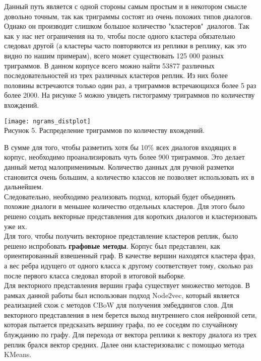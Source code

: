 \documentclass[a4paper,14pt]{article}
\begin{document}
\begin{justify}
\indent
Данный путь является с одной стороны самым простым и в некотором смысле довольно точным, так как триграммы состоят из очень похожих типов диалогов. Однако он производит слишком большое количество "кластеров"\ диалогов. Так как у нас нет ограничения на то, чтобы после одного кластера обязательно следовал другой (а кластеры часто повторяются из реплики в реплику, как это видно по нашим примерам), всего может существовать 125 000 разных триграммов. В данном корпусе всего можно найти 53877 различных последовательностей из трех различных кластеров реплик. Из них более половины встречаются только один раз, а триграммов встречающихся более 5 раз более 2000. На рисунке 5 можно увидеть гистограмму триграммов по количеству вхождений.
\begin{center}
	\texttt{[image: ngrams\_distplot]} \\
	Рисунок 5. Распределение триграммов по количеству вхождений.
\end{center}
В сумме для того, чтобы разметить хотя бы 10\% всех диалогов входящих в корпус, необходимо проанализировать чуть более 900 триграммов. Это делает данный метод малоприменимым. Количество данных для ручной разметки становится очень большим, а количество классов не позволяет использовать их в дальнейшем. \\
\indent
Следовательно, необходимо реализовать подход, который будет объединять похожие диалоги в меньшее количество отдельных кластеров. Для этого было решено создать векторные представления для коротких диалогов и кластеризовать уже их. \\
\indent
Для того, чтобы получить векторное представление кластеров реплик, было решено испробовать \textbf{графовые методы}. Корпус был представлен, как ориентированный взвешенный граф. В качестве вершин находятся кластера фраз, а вес ребра идущего от одного класса к другому соответствует тому, сколько раз после первого класса следовал второй в итоговой выборке. \\
\indent
Для векторного представления вершин графа существует множество методов. В рамках данной работы был использован подход Node2vec, который является  реализацией схож с методов CBoW для получения эмбеддингов слов. Для векторного представления в нем берется выход внутреннего слоя нейронной сети, которая пытается предсказать вершину графа, по ее соседям по случайному блужданию по графу. Для перехода от вектора реплики к вектору диалога из трех реплик брался вектор средних. Далее они кластеризовалис с помощью метода KMeans. \\

\end{justify}
\end{document}
